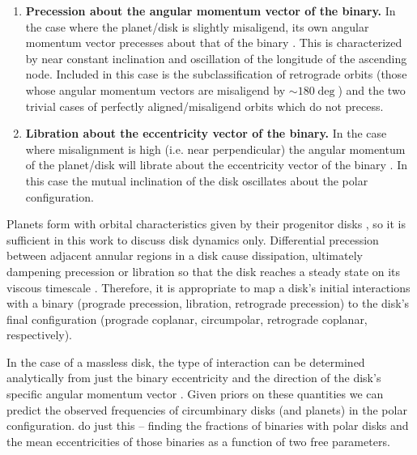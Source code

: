\documentclass[twocolumn]{aastex631}
\begin{document}
\begin{enumerate}
    \item {\bf Precession about the angular momentum vector of the binary.} In the case where the planet/disk
        is slightly misaligend, its own angular momentum vector precesses about that of the binary \citep[e.g.,][]{bate2000,lubow2000}.
        This is characterized by near constant
        inclination and oscillation of the longitude of the ascending node. Included in this case is the subclassification
        of retrograde orbits (those whose angular momentum vectors are misaligend by $\sim 180 \deg$) and the two
        trivial cases of perfectly aligned/misaligend orbits which do not precess. \label{enum:precession}
    \item {\bf Libration about the eccentricity vector of the binary.} In the case where misalignment is high (i.e. near
    perpendicular) the angular momentum of the planet/disk will librate about the eccentricity vector of the binary 
    \citep[e.g.,][]{verrier2009,farago2010,doolin2011}. In this case the mutual inclination of the disk oscillates about the
    polar configuration.
    \label{enum:libration}
\end{enumerate}

Planets form with orbital characteristics given by their progenitor disks \citep[e.g.,][]{childs2021}, so it is sufficient in this work to
discuss disk dynamics only.
Differential precession between adjacent annular regions in a disk cause dissipation, ultimately dampening precession or libration
so that the disk reaches a steady state on its viscous timescale \citep[see also \citet{nixon2011,foucart2013,foucart2014}]{bate2000}.
Therefore, it is appropriate to map a disk's
initial interactions with a binary (prograde precession, libration, retrograde precession) to the disk's final configuration
(prograde coplanar, circumpolar, retrograde coplanar, respectively).

In the case of a massless disk, the type of interaction can be determined analytically from just the binary eccentricity and the
direction of the disk's specific angular momentum vector
\citep[parameterized by the disk inclination and its longitude of the ascending node][]{zanazzi2018}.
Given priors on these quantities we can predict the observed frequencies of circumbinary disks (and planets) in the polar configuration.
\citet{ceppi2024} do just this -- finding the fractions of binaries with polar disks and the mean eccentricities of those binaries
as a function of two free parameters.
\end{document}
